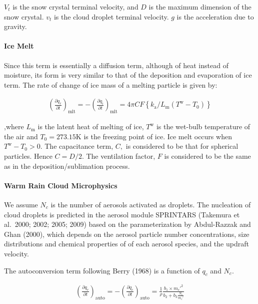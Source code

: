 \(V_{t}\) is the snow crystal terminal velocity, and \(D\) is the
maximum dimension of the snow crystal. \(v_{t}\) is the cloud droplet
terminal velocity. \(g\) is the acceleration due to gravity.

\hypertarget{ice-melt}{%
\paragraph{Ice Melt}\label{ice-melt}}

Since this term is essentially a diffusion term, although of heat
instead of moisture, its form is very similar to that of the deposition
and evaporation of ice term. The rate of change of ice mass of a melting
particle is given by:

\begin{eqnarray}
\left(\frac{\partial q_r}{\partial t}\right)_{\text {mlt}}
=-\left(\frac{\partial q_i}{\partial t}\right)_{\text {mlt}}
=4 \pi C F\left\{k_{\mathrm{a}} / L_{\mathrm{m}}\left(T^{\mathrm{w}}-T_{0}\right)\right\}
\end{eqnarray}

,where \(L_{\mathrm{m}}\) is the latent heat of melting of ice,
\(T^{\mathrm{w}}\) is the wet-bulb temperature of the air and
\(T_{0}=273.15\mathrm{K}\) is the freezing point of ice. Ice melt occurs
when \(T^{\mathrm{w}}-T_{0}>0\). The capacitance term, \(C,\) is
considered to be that for spherical particles. Hence \(C=D / 2 .\) The
ventilation factor, \(F\) is considered to be the same as in the
deposition/sublimation process.

\hypertarget{warm-rain-cloud-microphysics}{%
\paragraph{Warm Rain Cloud
Microphysics}\label{warm-rain-cloud-microphysics}}

We assume \(N_c\) is the number of aerosols activated as droplets. The
nucleation of cloud droplets is predicted in the aerosol module
SPRINTARS (Takemura et al.~2000; 2002; 2005; 2009) based on the
parameterization by Abdul-Razzak and Ghan (2000), which depends on the
aerosol particle number concentrations, size distributions and chemical
properties of of each aerosol species, and the updraft velocity.

The autoconversion term following Berry (1968) is a function of \(q_c\)
and \(N_c\).

\begin{eqnarray}
\left(\frac{\partial q_r}{\partial t}\right)_{\text {auto}}
=-\left(\frac{\partial q_c}{\partial t}\right)_{\text {auto}}
=\frac{1}{\rho}
\frac{b_1 \times m_{c}'^{2}}{b_2+b_3 \frac{N_{c}}{m_{c}'}}
\end{eqnarray}

